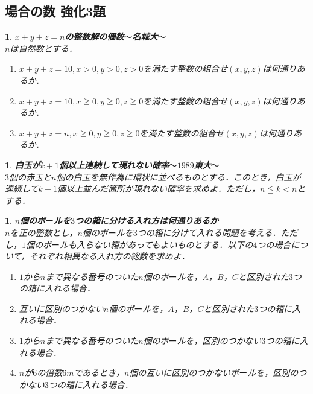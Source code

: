 \documentclass[10pt,
fleqn,
dvipdfmx,
uplatex
]{jsarticle}
\newtheorem{question}[Question]{}
\begin{document}
\subsection{場合の数 強化3題}



\begin{question}{\bf\boldmath $x+y+z=n$の整数解の個数$〜$名城大$〜$}\\
$n$は自然数とする．
\begin{enumerate}
\item $x+y+z={10},x>0,y>0,z>0$を満たす整数の組合せ$\left(x,y,z\right)$は何通りあるか．
\item $x+y+z={10},x\geqq 0,y\geqq 0,z\geqq 0$を満たす整数の組合せ$\left(x,y,z\right)$は何通りあるか．
\item $x+y+z=n,x\geqq 0,y\geqq 0,z\geqq 0$を満たす整数の組合せ$\left(x,y,z\right)$は何通りあるか．
\end{enumerate}

\end{question}



\begin{question}{\bf\boldmath 白玉が$k+1$個以上連続して現れない確率$〜1989$東大$〜$}\\
$3$個の赤玉と$n$個の白玉を無作為に環状に並べるものとする．このとき，白玉が連続して$k+1$個以上並んだ箇所が現れない確率を求めよ．ただし，$n\leqq k<n$とする．
\end{question}



\begin{question}{\bf\boldmath $n$個のボ$ー$ルを$3$つの箱に分ける入れ方は何通りあるか}\\
$n$を正の整数とし，$n$個のボ$ー$ルを$3$つの箱に分けて入れる問題を考える．ただし，$1$個のボ$ー$ルも入らない箱があってもよいものとする．以下の$4$つの場合について，それぞれ相異なる入れ方の総数を求めよ．
\begin{enumerate}
\item $1$から$n$まで異なる番号のついた$n$個のボ$ー$ルを，$A$，$B$，$C$と区別された$3$つの箱に入れる場合．
\item 互いに区別のつかない$n$個のボ$ー$ルを，$A$，$B$，$C$と区別された$3$つの箱に入れる場合．
\item $1$から$n$まで異なる番号のついた$n$個のボ$ー$ルを，区別のつかない$3$つの箱に入れる場合．
\item $n$が$6$の倍数$6m$であるとき，$n$個の互いに区別のつかないボ$ー$ルを，区別のつかない$3$つの箱に入れる場合．
\end{enumerate}

\end{question}
\end{document}
